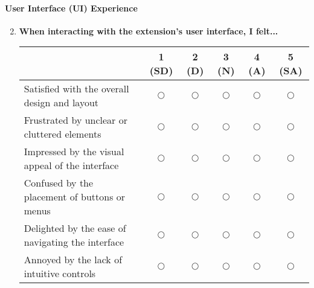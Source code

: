 \documentclass{article}
\begin{document}
\paragraph{User Interface (UI) Experience}
\begin{enumerate}
    \setcounter{enumi}{1}
    \item \textbf{When interacting with the extension's user interface, I felt...}
    
    \begin{tabularx}{\textwidth}{|X|c|c|c|c|c|}
        \hline
        & 1 (SD) & 2 (D) & 3 (N) & 4 (A) & 5 (SA) \\
        \hline
        Satisfied with the overall design and layout & $\bigcirc$ & $\bigcirc$ & $\bigcirc$ & $\bigcirc$ & $\bigcirc$ \\
        \hline
        Frustrated by unclear or cluttered elements & $\bigcirc$ & $\bigcirc$ & $\bigcirc$ & $\bigcirc$ & $\bigcirc$ \\
        \hline
        Impressed by the visual appeal of the interface & $\bigcirc$ & $\bigcirc$ & $\bigcirc$ & $\bigcirc$ & $\bigcirc$ \\
        \hline
        Confused by the placement of buttons or menus & $\bigcirc$ & $\bigcirc$ & $\bigcirc$ & $\bigcirc$ & $\bigcirc$ \\
        \hline
        Delighted by the ease of navigating the interface & $\bigcirc$ & $\bigcirc$ & $\bigcirc$ & $\bigcirc$ & $\bigcirc$ \\
        \hline
        Annoyed by the lack of intuitive controls & $\bigcirc$ & $\bigcirc$ & $\bigcirc$ & $\bigcirc$ & $\bigcirc$ \\
        \hline
    \end{tabularx}
\end{enumerate}
\end{document}

